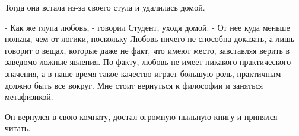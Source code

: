 \documentclass[a4paper]{article}
\theoremstyle{defin}
\theoremstyle{theorem}
\theoremstyle{prop}
\theoremstyle{lemma}
\theoremstyle{ex}
\theoremstyle{col}
\begin{document}
Тогда она встала из-за своего стула и удалилась домой.

- Как же глупа любовь, - говорил Студент, уходя домой. - От нее куда меньше пользы, чем от логики, поскольку Любовь ничего не способна доказать, а лишь говорит о вещах, которые даже не факт, что имеют место, завставляя верить в заведомо ложные явления. По факту, любовь не имеет никакого практического значения, а в наше время такое качество играет большую роль, практичным должно быть все вокруг. Мне стоит вернуться к философии и заняться метафизикой.

Он вернулся в свою комнату, достал огромную пыльную книгу и принялся читать.
\end{document}
